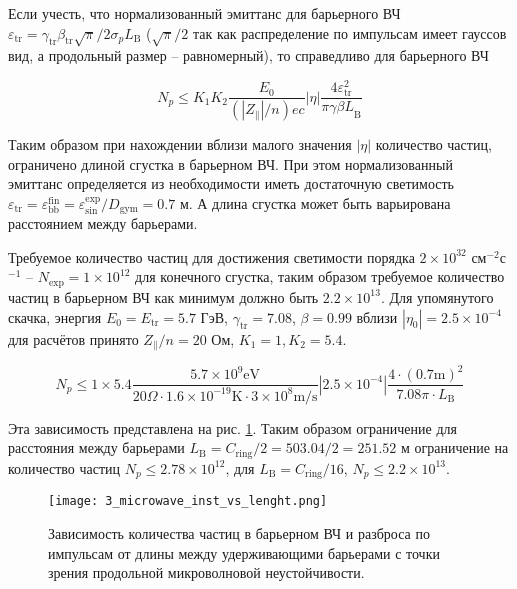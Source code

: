 \noindent Если учесть, что нормализованный эмиттанс для барьерного ВЧ $\varepsilon_{\textrm{tr}}=\gamma_{\textrm{tr}}\beta_{\textrm{tr}}\sqrt{\pi}/2\sigma_p L_{\textrm{B}}$ ($\sqrt{\pi}/2$ так как распределение по импульсам имеет гауссов вид, а продольный размер -- равномерный), то справедливо для барьерного ВЧ

\begin{equation}
N_p\le K_1K_2\frac{E_0}{\left(\left|Z_\parallel\right|/n\right)ec}\left|\eta\right|\frac{4\varepsilon_{\text{tr}}^2}{{\pi\gamma\beta L}_{\textrm{B}}}
\label{eq:microwave_instability_2}
\end{equation}

\noindent Таким образом при нахождении вблизи малого значения $\left|\eta\right|$ количество частиц, ограничено длиной сгустка в барьерном ВЧ. При этом нормализованный эмиттанс определяется из необходимости иметь достаточную светимость $\varepsilon_{\textrm{tr}}=\varepsilon_{\textrm{bb}}^{\textrm{fin}}=\varepsilon_{\textrm{sin}}^{\textrm{exp}}/D_{\textrm{gym}}=0.7$ м. А длина сгустка может быть варьирована расстоянием между барьерами. 

\par Требуемое количество частиц для достижения светимости порядка $2\times10^{32}$ см$^{-2}$с$^{-1}$ – $N_{\textrm{exp}}=1\times10^{12}$ для конечного сгустка, таким образом требуемое количество частиц в барьерном ВЧ как минимум должно быть $2.2\times10^{13}$. Для упомянутого скачка, энергия $E_0=E_{\textrm{tr}}=5.7$ ГэВ, $\gamma_{\textrm{tr}}=7.08$, $\beta=0.99$ вблизи $\left|\eta_0\right|=2.5\times10^{-4}$ для расчётов принято $Z_\parallel/n=20$ Ом, $K_1=1, K_2=5.4$.

\begin{equation}
N_p\le1\times5.4\frac{5.7\times10^{9} \text{eV}}{20 \Omega \cdot 1.6\times10^{-19} \text{K} \cdot 3\times10^{8} \text{m/s}} |2.5\times10^{-4}|\frac{4\cdot(0.7 \text{m})^2}{7.08 \pi \cdot L_{\text{B}}}
\label{eq:microwave_instability_example}
\end{equation}

\noindent Эта зависимость представлена на рис. \ref{fig:3_microwave_inst_vs_lenght.png}. Таким образом ограничение для расстояния между барьерами $L_{\text{B}}=C_{\textrm{ring}}/2=503.04/2=251.52$ м ограничение на количество частиц $N_p\le2.78\times10^{12}$, для $L_{\textrm{B}}=C_{\textrm{ring}}/16$, $N_p\le2.2\times10^{13}$.

\begin{figure}
\centering
   \texttt{[image: 3\_microwave\_inst\_vs\_lenght.png]}
   \caption{Зависимость количества частиц в барьерном ВЧ и разброса по импульсам от длины между удерживающими барьерами с точки зрения продольной микроволновой неустойчивости.}
   \label{fig:3_microwave_inst_vs_lenght.png}
\end{figure}

